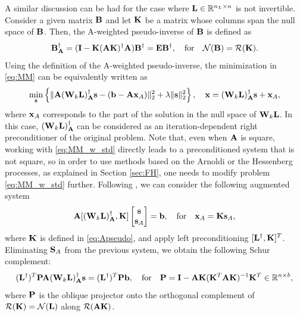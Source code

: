 \documentclass[11pt]{article}
\numberwithin{equation}{section}
\newcommand{\bfA}{{\bf A}}
\newcommand{\bfB}{{\bf B}}
\newcommand{\bfE}{{\bf E}}
\newcommand{\bfI}{{\bf I}}
\newcommand{\bfK}{{\bf K}}
\newcommand{\bfL}{{\bf L}}
\newcommand{\bfP}{{\bf P}}
\newcommand{\bfS}{{\bf S}}
\newcommand{\bfW}{{\bf W}}
\newcommand{\bfb}{{\bf b}}
\newcommand{\bfs}{{\bf s}}
\newcommand{\bfx}{{\bf x}}
\begin{document}
A similar discussion can be had for the case where $\bfL \in \mathbb{R}^{n_{L} \times n}$ is not invertible. Consider a given matrix $\bfB$ and let $\bfK$ be a matrix whose columns span the null space of $\bfB$. Then, the A-weighted pseudo-inverse of $\bfB$ is defined as 
\begin{equation}\label{eq:Apseudo}
    \bfB ^{\dagger}_{\bfA} = (\bfI - \bfK(\bfA\bfK)^{\dagger}\bfA) \bfB ^{\dagger} =\bfE\bfB ^{\dagger}, \quad \text{for}  \quad \mathcal{N}(\bfB)= \mathcal{R}(\bfK).
\end{equation}
Using the definition of the A-weighted pseudo-inverse, the minimization in \eqref{eq:MM} can be equivalently written as 
\begin{equation}\label{eq:MM_w_std} 
   \min_\bfs \left\{\| \bfA (\bfW_k \bfL)^{\dagger}_{\bfA} \bfs - (\bfb-\bfA\bfx_A) \|_2^2 + \lambda \| \bfs \|_2^2\right\}, \quad \bfx = (\bfW_k \bfL)^{\dagger}_{\bfA} \bfs + \bfx_A,
\end{equation}
where $\bfx_A$ corresponds to the part of the solution in the null space of $\bfW_k \bfL$. In this case, $(\bfW_k \bfL)^{\dagger}_{\bfA}$ can be considered as an iteration-dependent right preconditioner of the original problem. Note that, even when $\bfA$ is square, working with \eqref{eq:MM_w_std} directly leads to a preconditioned system that is not square, so in order to use methods based on the Arnoldi or the Hessenberg processes, as explained in Section \ref{sec:FH}, one needs to modify problem \eqref{eq:MM_w_std} further. Following \cite{hansen2007smoothing, Sabate2019TV}, we can consider the following augmented system
\[
\bfA [(\bfW_k\bfL)^{\dagger}_{\bfA}, \bfK ]\begin{bmatrix}
\bfs \\ \bfs_{A}
\end{bmatrix} = \bfb, \quad \text{for} \quad \bfx_A=\bfK \bfs_A,
\]
where $\bfK$ is defined in \eqref{eq:Apseudo}, 
and apply left preconditioning $[\bfL^{\dagger}, \bfK]^{T}$. Eliminating $\bfS_A$ from the previous system, we obtain the following Schur complement:
\begin{equation}\label{eq_F_square} 
    (\bfL^\dagger)^T \bfP  \bfA (\bfW_k \bfL)^{\dagger}_{\bfA} \bfs =(\bfL^\dagger)^T \bfP \bfb, \quad \text{for}\quad \bfP =\bfI-\bfA\bfK(\bfK^T\bfA \bfK)^{-1} \bfK^T \in \mathbb{R}^{n\times b},
\end{equation}
where $\bfP$ is the oblique projector onto the orthogonal complement of $\mathcal{R}(\bfK)=\mathcal{N}(\bfL)$ along $\mathcal{R}(\bfA\bfK)$.
\end{document}
